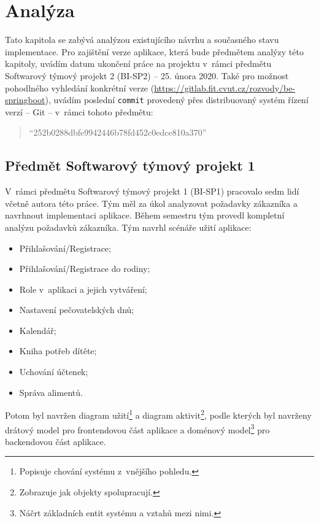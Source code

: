 \chapter{Analýza}\label{chapter:analyza}

Tato kapitola se zabývá analýzou existujícího návrhu a současného stavu implementace. Pro zajištění verze aplikace, která bude předmětem analýzy této kapitoly, uvádím datum ukončení práce na projektu v~rámci předmětu Softwarový týmový projekt 2 (BI-SP2) -- 25. února 2020. Také pro možnost pohodlného vyhledání konkrétní verze  (\url{https://gitlab.fit.cvut.cz/rozvody/be-springboot}), uvádím poslední \texttt{commit} provedený přes distribuovaný systém řízení verzí -- Git -- v~rámci tohoto předmětu: 
\begin{quote}
    \enquote{252b0288dbfe9942446b78fd452c0edce810a370}
\end{quote}

\section{Předmět Softwarový týmový projekt 1}\label{analyza:navrh:sp1}
    V~rámci předmětu Softwarový týmový projekt 1 (BI-SP1) pracovalo sedm lidí včetně autora této práce. Tým měl za úkol analyzovat požadavky zákazníka a navrhnout implementaci aplikace. Během semestru tým provedl kompletní analýzu požadavků zákazníka. Tým navrhl scénáře užití aplikace:
    \begin{itemize}
    \setlength\itemsep{0.3em}
	   \item Přihlašování/Registrace;
	   \item Přihlašování/Registrace do rodiny;
	   \item Role v~aplikaci a jejich vytváření;
	   \item Nastavení pečovatelských dnů;
	   \item Kalendář;
	   \item Kniha potřeb dítěte;
	   \item Uchování účtenek;
	   \item Správa alimentů.
	\end{itemize}
    Potom byl navržen diagram užití\footnote{Popisuje chování systému z~vnějšího pohledu.} a diagram aktivit\footnote{Zobrazuje jak objekty spolupracují.}, podle kterých byl navrženy drátový model pro frontendovou část aplikace a doménový model\footnote{Náčrt základních entit systému a vztahů mezi nimi.} pro backendovou část aplikace. 
    
